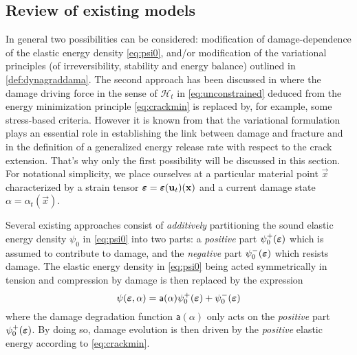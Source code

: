 \subsection{Review of existing models} \label{sec:reviewTC}
In general two possibilities can be considered: modification of damage-dependence of the elastic energy density \eqref{eq:psi0}, and/or modification of the variational principles (of irreversibility, stability and energy balance) outlined in \cref{def:dynagraddama}. The second approach has been discussed in \cite{LorentzKazymyrenko:2014,MieheSchaenzelUlmer:2015} where the damage driving force in the sense of $\mathcal{H}_t$ in \eqref{eq:unconstrained} deduced from the energy minimization principle \eqref{eq:crackmin} is replaced by, for example, some stress-based criteria. However it is known from \cite{SicsicMarigo:2013} that the variational formulation plays an essential role in establishing the link between damage and fracture and in the definition of a generalized energy release rate with respect to the crack extension. That's why only the first possibility will be discussed in this section. For notational simplicity, we place ourselves at a particular material point $\vec{x}$ characterized by a strain tensor $\eps=\eps(\vec{u}_t)(\vec{x})$ and a current damage state $\alpha=\alpha_t(\vec{x})$.

Several existing approaches consist of \emph{additively} partitioning the sound elastic energy density $\psi_0$ in \eqref{eq:psi0} into two parts: a \emph{positive} part $\psi_0^+(\eps)$ which is assumed to contribute to damage, and the \emph{negative} part $\psi_0^-(\eps)$ which resists damage. The elastic energy density in \eqref{eq:psi0} being acted symmetrically in tension and compression by damage is then replaced by the expression
\begin{equation} \label{eq:elasticTC}
\psi(\eps,\alpha)=\mathsf{a}(\alpha)\psi_0^+(\eps)+\psi_0^-(\eps)
\end{equation}
where the damage degradation function $\mathsf{a}(\alpha)$ only acts on the \emph{positive} part $\psi_0^+(\eps)$. By doing so, damage evolution is then driven by the \emph{positive} elastic energy according to \eqref{eq:crackmin}.

